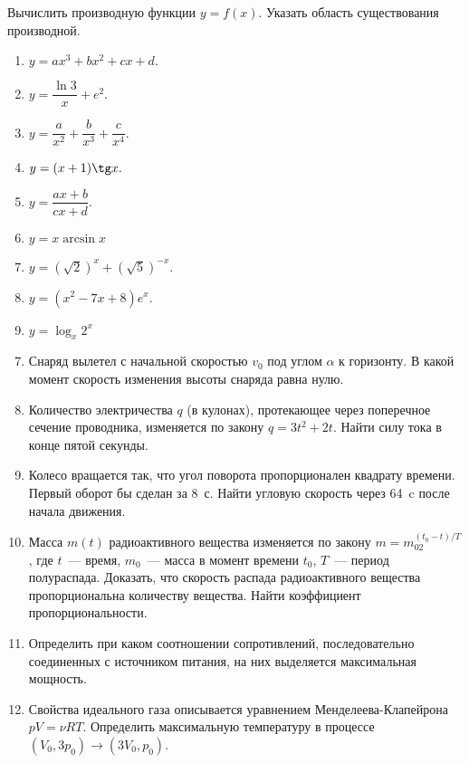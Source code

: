 \documentclass[a4paper,12pt]{article} %
\begin{document}
Вычислить производную функции $ y=f(x) $. Указать область
существования производной.
\begin{multicols}{3}
	\begin{enumerate}\bfseries
		\item $ y=ax^3+bx^2+cx+d. $
		\item $ y=\dfrac{\ln3}{x}+e^2.	 $
		\item 
		$ y=\dfrac{a}{x^2}+\dfrac{b}{x^3}+\dfrac{c}{x^4}. $
		\item $ y=(x+1)\tg x. $
		\item $ y=\dfrac{ax+b}{cx+d}. $
		\item $ y=x\arcsin x $
		\item $ y=(\sqrt{2})^x+(\sqrt{5})^{-x}. $
		\item $ y=(x^2-7x+8)e^x. $
		\item $ y=\log_x2^x  $
	\end{enumerate}
\end{multicols}
\begin{enumerate}[label=\textbf{\arabic*.}]
	\setcounter{enumi}{6}
	\item Снаряд вылетел с начальной скоростью $ v_0 $ под
	углом $ \alpha $ к горизонту. В какой момент скорость
	изменения высоты снаряда равна нулю.
	\item Количество электричества $ q $ (в кулонах),
	протекающее через поперечное сечение проводника,
	изменяется по закону $ q=3t^2+2t $. Найти силу тока
	в конце пятой секунды.
	\item Колесо вращается так, что угол поворота
	 пропорционален квадрату времени. Первый оборот бы сделан
	 за 8~с. Найти угловую скорость через 64~c после начала
	 движения.
	 \item Масса $ m(t) $ радиоактивного вещества изменяется
	 по закону $ m=m_02^{(t_0-t)/T} $, где $ t $~--- время,
	 $ m_0 $~--- масса в момент времени $ t_0 $, $ T $~---
	 период полураспада. Доказать, что скорость распада
	 радиоактивного вещества пропорциональна количеству
	 вещества. Найти коэффициент пропорциональности.
	 \item Определить при каком соотношении сопротивлений,
	 последовательно соединенных с источником питания, на них выделяется максимальная мощность.
	 \item Свойства идеального газа описывается уравнением Менделеева-Клапейрона $ pV=\nu RT $. Определить 
	 максимальную температуру в процессе 
	 $ (V_0, 3p_0)\rightarrow(3V_0, p_0) $.
\end{enumerate}
\end{document}
